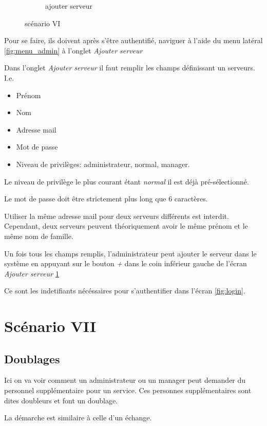 \begin{figure}[!h]
\begin{subfigure}{.45\textwidth}
            \caption{ajouter serveur}
            \label{fig:ajout_serveur}
        \end{subfigure}
        \caption{scénario VI}
        \label{fig:scen06}
    \end{figure}

    Pour se faire, ils doivent après s'être authentifié, naviguer à l'aide 
    du menu latéral \ref{fig:menu_admin} à l'onglet \textit{Ajouter serveur}

    Dans l'onglet \textit{Ajouter serveur} il faut remplir les champs définissant un serveurs. I.e. 
    \smallskip
    \begin{itemize}
        \item Prénom
        \item Nom 
        \item Adresse mail
        \item Mot de passe
        \item Niveau de privilèges: administrateur, normal, manager. 
    \end{itemize}
    \medskip
    Le niveau de privilège le plus courant étant \textit{normal} il est déjà 
    pré-sélectionné.

    Le mot de passe doit être strictement plus long que 6 caractères.

    Utiliser la même adresse mail pour deux serveurs différents est interdit. 
    Cependant, deux serveurs peuvent théoriquement avoir le même prénom et le même nom de 
    famille.

    Un fois tous les champs remplis, l'administrateur peut ajouter le serveur
    dans le système en appuyant sur le bouton \textit{+} dans le coin inférieur
    gauche de l'écran \textit{Ajouter serveur} \ref{fig:ajout_serveur}

    Ce sont les indetifiants nécéssaires pour s'authentifier dans l'écran \ref{fig:login}.
    \section[Doublages - Scénario VII]{Scénario VII}
        \subsection*{Doublages}
        Ici on va voir comment un administrateur ou un manager peut demander
        du personnel supplémentaire pour un service. Ces personnes supplémentaires sont dites 
        doubleurs et font un doublage.

        La démarche est similaire à celle d'un échange.

